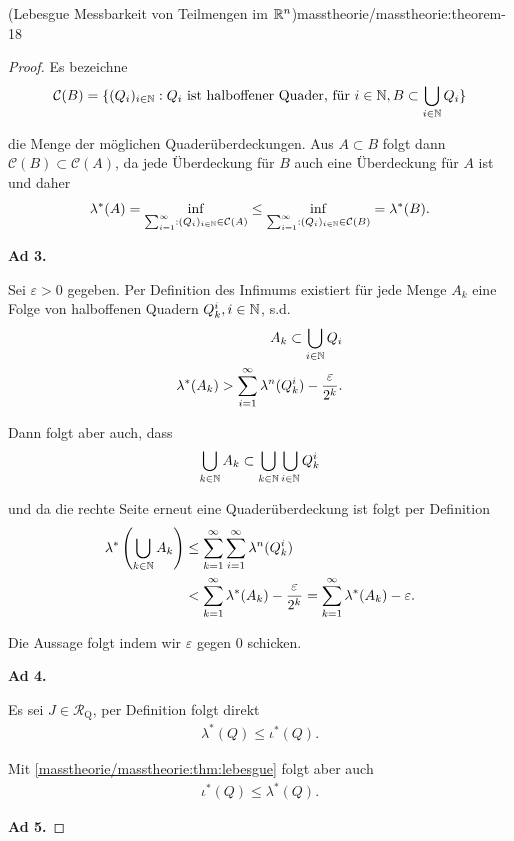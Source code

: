 \begin{theorem}{(Lebesgue Messbarkeit von Teilmengen im \protect\(\mathbb{R}^n\protect\))}{masstheorie/masstheorie:theorem-18}
\begin{proof}
\par
Es bezeichne
\begin{align*}
\mathcal{C}(B) = \{ (Q_i)_{i\in\mathbb{N}}: Q_i \text{ ist halboffener Quader, für }i\in\mathbb{N}, B\subset \bigcup_{i\in\mathbb{N}} Q_i  \}
\end{align*}
\par
die Menge der möglichen Quaderüberdeckungen. Aus \(A\subset B\) folgt dann \(\mathcal{C}(B) \subset \mathcal{C}(A)\), da jede Überdeckung für \(B\) auch eine Überdeckung für \(A\) ist und daher
\begin{align*}
\lambda^\ast(A) = \inf_{\sum_{i=1}^\infty:(Q_i)_{i\in\mathbb{N}}\in \mathcal{C}(A)} \leq 
\inf_{\sum_{i=1}^\infty:(Q_i)_{i\in\mathbb{N}}\in \mathcal{C}(B)} = \lambda^\ast(B).
\end{align*}
\par
\textbf{Ad 3.}

\par
Sei \(\varepsilon>0\) gegeben. Per Definition des Infimums existiert für jede Menge \(A_k\) eine Folge von halboffenen Quadern \(Q_k^i, i\in\mathbb{N}\), s.d.
\begin{align*}
A_k \subset \bigcup_{i\in\mathbb{N}} Q_i\\
\lambda^\ast(A_k) > \sum_{i=1}^\infty \lambda^n(Q_k^i) - \frac{\varepsilon}{2^k}.
\end{align*}
\par
Dann folgt aber auch, dass
\begin{align*}
\bigcup_{k\in\mathbb{N}} A_k \subset \bigcup_{k\in\mathbb{N}}\bigcup_{i\in\mathbb{N}} Q_k^i
\end{align*}
\par
und da die rechte Seite erneut eine Quaderüberdeckung ist folgt per Definition
\begin{align*}
\lambda^\ast\left(\bigcup_{k\in\mathbb{N}} A_k\right) 
&\leq \sum_{k=1}^\infty\sum_{i=1}^\infty \lambda^n(Q_k^i)\\
&<
\sum_{k=1}^\infty \lambda^\ast(A_k) - \frac{\varepsilon}{2^k} =
\sum_{k=1}^\infty \lambda^\ast(A_k) - \varepsilon.
\end{align*}
\par
Die Aussage folgt indem wir \(\varepsilon\) gegen 0 schicken.

\par
\textbf{Ad 4.}

\par
Es sei \(J\in\mathcal{R}_{\text{Q}}\), per Definition folgt direkt
\begin{align*}
\lambda^\ast(Q)\leq \iota^\ast(Q).
\end{align*}
\par
Mit \cref{masstheorie/masstheorie:thm:lebesgue} folgt aber auch
\begin{align*}
\iota^\ast(Q)\leq \lambda^\ast(Q).
\end{align*}
\par
\textbf{Ad 5.}


\end{proof}
\end{theorem}
